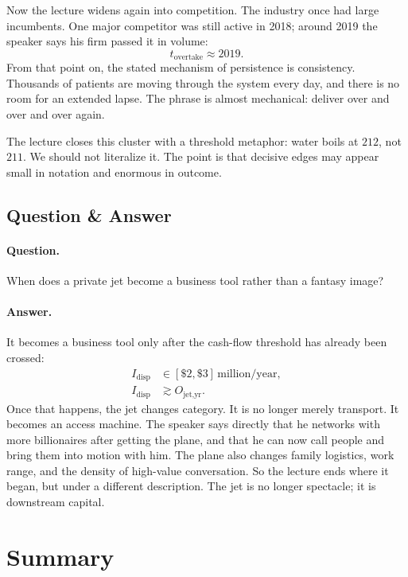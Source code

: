 Now the lecture widens again into competition. The industry once had large incumbents. One major competitor was still active in 2018; around 2019 the speaker says his firm passed it in volume:
\begin{equation}
t_{\text{overtake}} \approx 2019.
\end{equation}
From that point on, the stated mechanism of persistence is consistency. Thousands of patients are moving through the system every day, and there is no room for an extended lapse. The phrase is almost mechanical: deliver over and over and over again.

The lecture closes this cluster with a threshold metaphor: water boils at \(212\), not \(211\). We should not literalize it. The point is that decisive edges may appear small in notation and enormous in outcome.

\subsection{Question \& Answer}

\paragraph{Question.} When does a private jet become a business tool rather than a fantasy image?

\paragraph{Answer.} It becomes a business tool only after the cash-flow threshold has already been crossed:
\begin{align}
I_{\text{disp}} &\in [\$2,\$3]\,\text{million/year}, \\
I_{\text{disp}} &\gtrsim O_{\text{jet,yr}}.
\end{align}
Once that happens, the jet changes category. It is no longer merely transport. It becomes an access machine. The speaker says directly that he networks with more billionaires after getting the plane, and that he can now call people and bring them into motion with him. The plane also changes family logistics, work range, and the density of high-value conversation. So the lecture ends where it began, but under a different description. The jet is no longer spectacle; it is downstream capital.

\section{Summary}

